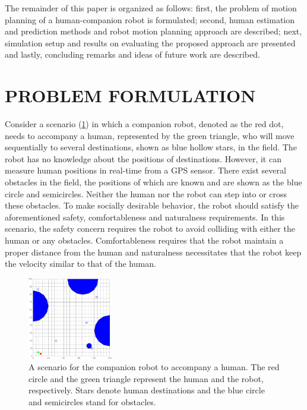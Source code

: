 \documentclass[letterpaper, 10 pt, conference]{ieeeconf}
\begin{document}
The remainder of this paper is organized as follows:
first, the problem of motion planning of a human-companion robot is formulated;
second, human estimation and prediction methods and robot motion planning approach are described;
next, simulation setup and results on evaluating the proposed approach are presented and lastly, concluding remarks and ideas of future work are described.


\section{PROBLEM FORMULATION}\label{sec:formulation}
Consider a scenario (\cref{fig:sim_field}) in which a companion robot, denoted as the red dot, needs to accompany a human, represented by the green triangle, who will move sequentially to several destinations, shown as blue hollow stars, in the field.
The robot has no knowledge about the positions of destinations.
However, it can measure human positions in real-time from a GPS sensor.
There exist several obstacles in the field, the positions of which are known and are shown as the blue circle and semicircles. 
Neither the human nor the robot can step into or cross these obstacles. 
To make socially desirable behavior, the robot should satisfy the aforementioned safety, comfortableness and naturalness requirements.
In this scenario, the safety concern requires the robot to avoid colliding with either the human or any obstacles.
Comfortableness requires that the robot maintain a proper distance from the human and naturalness necessitates that the robot keep the velocity similar to that of the human.

\begin{figure}
\centering
\includegraphics[width=0.33\textwidth]{figures/sim_field}
\caption{A scenario for the companion robot to accompany a human. The red circle and the green triangle represent the human and the robot, respectively. Stars denote human destinations and the blue circle and semicircles stand for obstacles.}
\label{fig:sim_field}
\end{figure}
\end{document}
